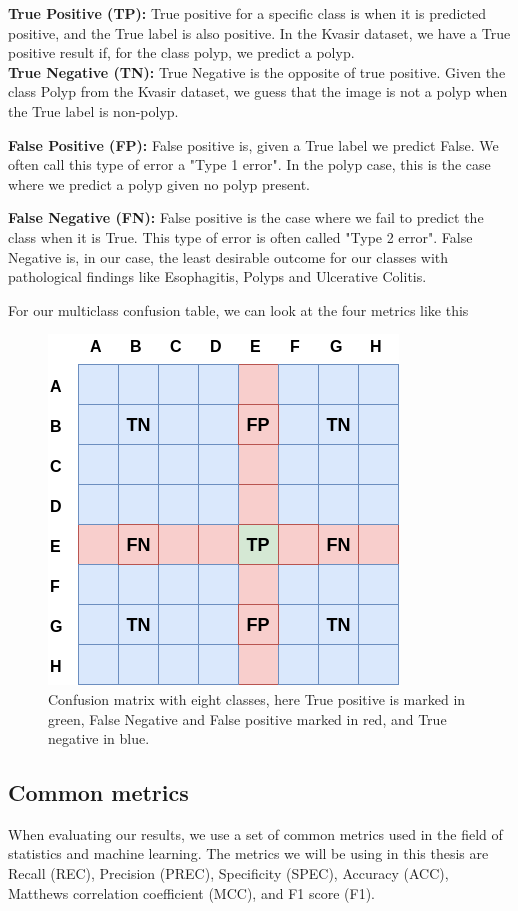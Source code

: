 \textbf{True Positive (TP): } True positive for a specific class is when it is predicted positive, and the True label is also positive.  In the Kvasir dataset, we have a True positive result if, for the class polyp, we predict a polyp.\\

\textbf{True Negative (TN): } True Negative is the opposite of true positive. Given the class Polyp from the Kvasir dataset, we guess that the image is not a polyp when the True label is non-polyp. 

\textbf{False Positive (FP): } False positive is, given a True label we predict False. We often call this type of error a "Type 1 error".   In the polyp case, this is the case where we predict a polyp given no polyp present.


\textbf{False Negative (FN): } False positive is the case where we fail to predict the class when it is True. This type of error is often called "Type 2 error". False Negative is, in our case, the least desirable outcome for our classes with pathological findings like Esophagitis, Polyps and Ulcerative Colitis.

For our multiclass confusion table, we can look at the four metrics like this
\begin{figure}[h]
\centering
\includegraphics[scale=0.7]{experiments/figures/confusionmatrix.png}
\caption{
Confusion matrix with eight classes, here True positive is marked in green, False Negative and False positive marked in red, and True negative in blue.
}
\label{fig:confusionmatrix}
\end{figure}


\subsection{Common metrics}
When evaluating our results, we use a set of common metrics used in the field of statistics and machine learning.  The metrics we will be using in this thesis are Recall (REC), Precision (PREC), Specificity (SPEC), Accuracy (ACC), Matthews correlation coefficient (MCC), and F1 score (F1). 


